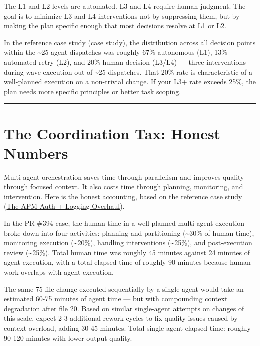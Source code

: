 \documentclass[
  a4paper,
  DIV=11,
  numbers=noendperiod]{scrreprt}
\begin{document}
The L1 and L2 levels are automated. L3 and L4 require human judgment.
The goal is to minimize L3 and L4 interventions not by suppressing them,
but by making the plan specific enough that most decisions resolve at L1
or L2.

In the reference case study (\href{../case-study-apm-overhaul.qmd}{case
study}), the distribution across all decision points within the
\textasciitilde25 agent dispatches was roughly 67\% autonomous (L1),
13\% automated retry (L2), and 20\% human decision (L3/L4) --- three
interventions during wave execution out of \textasciitilde25 dispatches.
That 20\% rate is characteristic of a well-planned execution on a
non-trivial change. If your L3+ rate exceeds 25\%, the plan needs more
specific principles or better task scoping.

\begin{center}\rule{0.5\linewidth}{0.5pt}\end{center}

\section{The Coordination Tax: Honest
Numbers}\label{the-coordination-tax-honest-numbers}

Multi-agent orchestration saves time through parallelism and improves
quality through focused context. It also costs time through planning,
monitoring, and intervention. Here is the honest accounting, based on
the reference case study (\href{../case-study-apm-overhaul.qmd}{The APM
Auth + Logging Overhaul}).

In the PR \#394 case, the human time in a well-planned multi-agent
execution broke down into four activities: planning and partitioning
(\textasciitilde30\% of human time), monitoring execution
(\textasciitilde20\%), handling interventions (\textasciitilde25\%), and
post-execution review (\textasciitilde25\%). Total human time was
roughly 45 minutes against 24 minutes of agent execution, with a total
elapsed time of roughly 90 minutes because human work overlaps with
agent execution.

The same 75-file change executed sequentially by a single agent would
take an estimated 60-75 minutes of agent time --- but with compounding
context degradation after file 20. Based on similar single-agent
attempts on changes of this scale, expect 2-3 additional rework cycles
to fix quality issues caused by context overload, adding 30-45 minutes.
Total single-agent elapsed time: roughly 90-120 minutes with lower
output quality.
\end{document}
